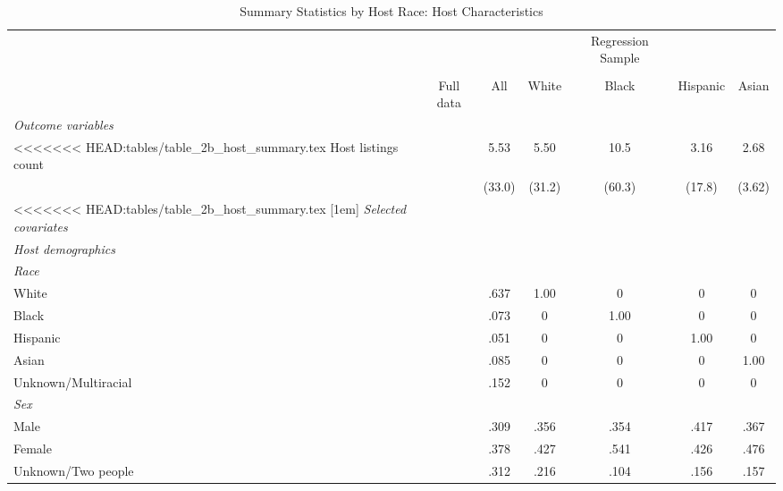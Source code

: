 {
	\begin{longtable}{l*{6}{c}}
		\caption{Summary Statistics by Host Race: Host Characteristics}\\
		
		\hline
		&\multicolumn{1}{c}{}&\multicolumn{1}{c}{}&\multicolumn{1}{c}{}&\multicolumn{1}{c}{Regression Sample}&\multicolumn{1}{c}{}&\multicolumn{1}{c}{}\\
		\cline{3-7}\\
			&\multicolumn{1}{c}{Full data}&\multicolumn{1}{c}{All}&\multicolumn{1}{c}{White}&\multicolumn{1}{c}{Black}&\multicolumn{1}{c}{Hispanic}&\multicolumn{1}{c}{Asian}\\
		\hline\hline           
		     
		\textit{Outcome variables} \\
<<<<<<< HEAD:tables/table_2b_host_summary.tex
		Host listings count         & &      5.53&      5.50 &      10.5&    3.16 & 2.68\\
		&	&     (33.0)         &     (31.2)         &     (60.3)         &     (17.8) & 	(3.62)         \\
<<<<<<< HEAD:tables/table_2b_host_summary.tex
		[1em]
		\textit{Selected covariates} \\
		\hline\hline
		\textit{Host demographics} \\
		\hline
		\textit{Race} \\
		White     & &      .637         &       1.00         &      0         &      0 	& 		0         \\
		Black     &  &    .073       &       0         &      1.00         &      0 	& 		0         \\
		Hispanic     & &      .051         &       0         &      0         &      1.00 	& 		0         \\
		Asian     &   &   .085      &       0         &      0         &      0 	& 		1.00         \\
		Unknown/Multiracial     & &      .152         &       0         &      0         &      0 	& 		0         \\
		[1em]
		\textit{Sex} \\
		Male     & &      .309         &       .356         &      .354         &      .417 	& 		.367        \\
		Female     & &      .378         &       .427        &      .541         &      .426 	& 		.476         \\
		Unknown/Two people   &  &      .312         &       .216         &      .104         &      .156 	& 		.157         \\

\end{longtable}}
